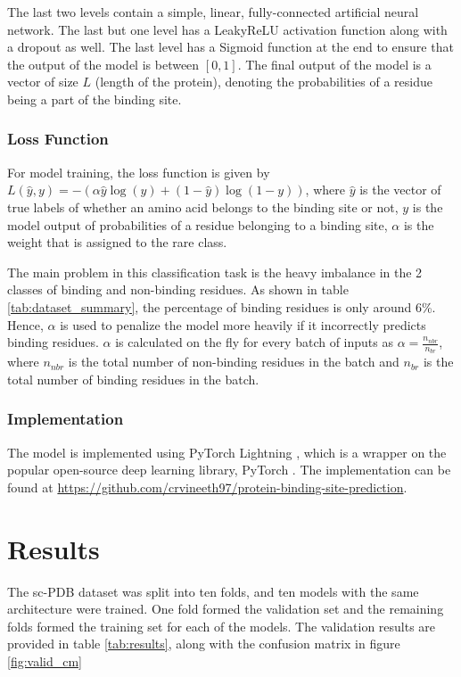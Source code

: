 \documentclass[journal=jacsat,manuscript=article]{achemso}
\begin{document}
The last two levels contain a simple, linear, fully-connected artificial neural network. The last but one level has a LeakyReLU activation function along with a dropout as well. The last level has a Sigmoid function at the end to ensure that the output of the model is between $[0, 1]$. The final output of the model is a vector of size $L$ (length of the protein), denoting the probabilities of a residue being a part of the binding site.

\subsubsection{Loss Function}
\quad For model training, the loss function is given by
$L(\hat{y}, y) = -(\alpha\hat{y}\log(y) + (1-\hat{y})\log(1-y))$, where $\hat{y}$ is the vector of true labels of whether an amino acid belongs to the binding site or not, $y$ is the model output of probabilities of a residue belonging to a binding site, $\alpha$ is the weight that is assigned to the rare class.

The main problem in this classification task is the heavy imbalance in the 2 classes of binding and non-binding residues. As shown in table \ref{tab:dataset_summary}, the percentage of binding residues is only around 6\%. Hence, $\alpha$ is used to penalize the model more heavily if it incorrectly predicts binding residues. $\alpha$ is calculated on the fly for every batch of inputs as $\alpha = \frac{n_{nbr}}{n_{br}}$, where $n_{nbr}$ is the total number of non-binding residues in the batch and $n_{br}$ is the total number of binding residues in the batch.

\subsubsection{Implementation}
\quad The model is implemented using PyTorch Lightning \cite{falcon2019pytorch}, which is a wrapper on the popular open-source deep learning library, PyTorch \cite{NEURIPS2019_9015}. The implementation can be found at \href{https://github.com/crvineeth97/protein-binding-site-prediction}{https://github.com/crvineeth97/protein-binding-site-prediction}.

\newpage
\section{Results}
\quad The sc-PDB dataset was split into ten folds, and ten models with the same architecture were trained. One fold formed the validation set and the remaining folds
formed the training set for each of the models. The validation results are provided in table \ref{tab:results}, along with the confusion matrix in figure \ref{fig:valid_cm}
\end{document}
